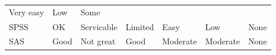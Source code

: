 \documentclass[]{book}
\begin{document}
\begin{longtable}[]{@{}lllllll@{}}
\begin{minipage}[t]{0.11\columnwidth}
Very easy\strut
\end{minipage} & \begin{minipage}[t]{0.17\columnwidth}\raggedright
Low\strut
\end{minipage} & \begin{minipage}[t]{0.05\columnwidth}\raggedright
Some\strut
\end{minipage}\tabularnewline
\begin{minipage}[t]{0.08\columnwidth}\raggedright
SPSS\strut
\end{minipage} & \begin{minipage}[t]{0.10\columnwidth}\raggedright
OK\strut
\end{minipage} & \begin{minipage}[t]{0.13\columnwidth}\raggedright
Servicable\strut
\end{minipage} & \begin{minipage}[t]{0.16\columnwidth}\raggedright
Limited\strut
\end{minipage} & \begin{minipage}[t]{0.11\columnwidth}\raggedright
Easy\strut
\end{minipage} & \begin{minipage}[t]{0.17\columnwidth}\raggedright
Low\strut
\end{minipage} & \begin{minipage}[t]{0.05\columnwidth}\raggedright
None\strut
\end{minipage}\tabularnewline
\begin{minipage}[t]{0.08\columnwidth}\raggedright
SAS\strut
\end{minipage} & \begin{minipage}[t]{0.10\columnwidth}\raggedright
Good\strut
\end{minipage} & \begin{minipage}[t]{0.13\columnwidth}\raggedright
Not great\strut
\end{minipage} & \begin{minipage}[t]{0.16\columnwidth}\raggedright
Good\strut
\end{minipage} & \begin{minipage}[t]{0.11\columnwidth}\raggedright
Moderate\strut
\end{minipage} & \begin{minipage}[t]{0.17\columnwidth}\raggedright
Moderate\strut
\end{minipage} & \begin{minipage}[t]{0.05\columnwidth}\raggedright
None\strut
\end{minipage}\tabularnewline

\end{longtable}
\end{document}

